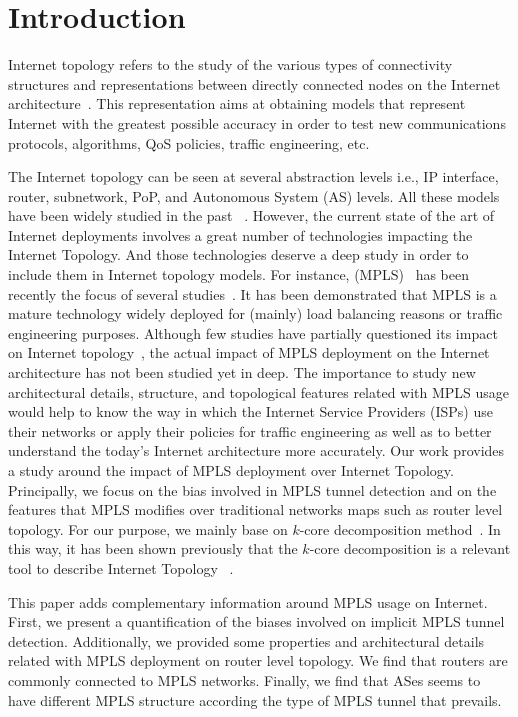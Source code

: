 \section{Introduction}\label{intro}
Internet topology refers to the study of the various types of
connectivity structures and representations between directly connected nodes on
the Internet architecture~\cite{Calvert97}. This representation aims at
obtaining models that represent  Internet with the greatest possible accuracy in order
to test new communications protocols, algorithms, QoS policies, traffic
engineering, etc.

The Internet topology can be seen at several abstraction levels i.e., IP
interface, router, subnetwork, PoP, and Autonomous System (AS) levels. All these
models have been widely studied in the past~\cite{DONNET13} . However, the
current state of the art of Internet deployments involves a great number of
technologies impacting the Internet Topology.  And those technologies deserve a
deep study in order to include them in Internet topology models.  For instance,
 (MPLS)~\cite{rfc3031} has been recently the
focus of several studies~\cite{SOM11,Donnet12,Vanaubel15}.  It has been
demonstrated that MPLS is a mature technology widely deployed for (mainly) load
balancing reasons or traffic engineering purposes.  Although few studies have
partially questioned its impact on Internet topology~\cite{BRICE07,Flach2012},
the actual impact of MPLS deployment on the Internet architecture has not been
studied yet in deep. The importance to study new architectural details,
structure, and topological features related with MPLS usage would help to know
the way in which the Internet Service Providers (ISPs) use their networks or
apply their policies for traffic engineering as well as to better understand the
today's Internet architecture more accurately. Our work provides a study around
the impact of MPLS deployment over Internet Topology. Principally, we focus on
the bias involved in MPLS tunnel detection and on the features that MPLS
modifies over traditional networks maps such as router level topology. For our
purpose, we mainly base on $k$-core decomposition method~\cite{batagelj2002}.
In this way, it has been shown previously that the $k$-core decomposition is a
relevant tool to describe Internet Topology ~\cite{Alvarez06k, Serrano06,
Serrano06, Alvarez08k}.

This paper adds complementary information around MPLS usage on Internet. First,
we present a quantification of the biases involved on implicit MPLS tunnel
detection. Additionally, we provided some properties and architectural details
related with MPLS deployment on router level topology. We find that routers are
commonly connected to  MPLS networks. Finally, we find that ASes seems to have
different MPLS structure according the type of MPLS tunnel that prevails.

